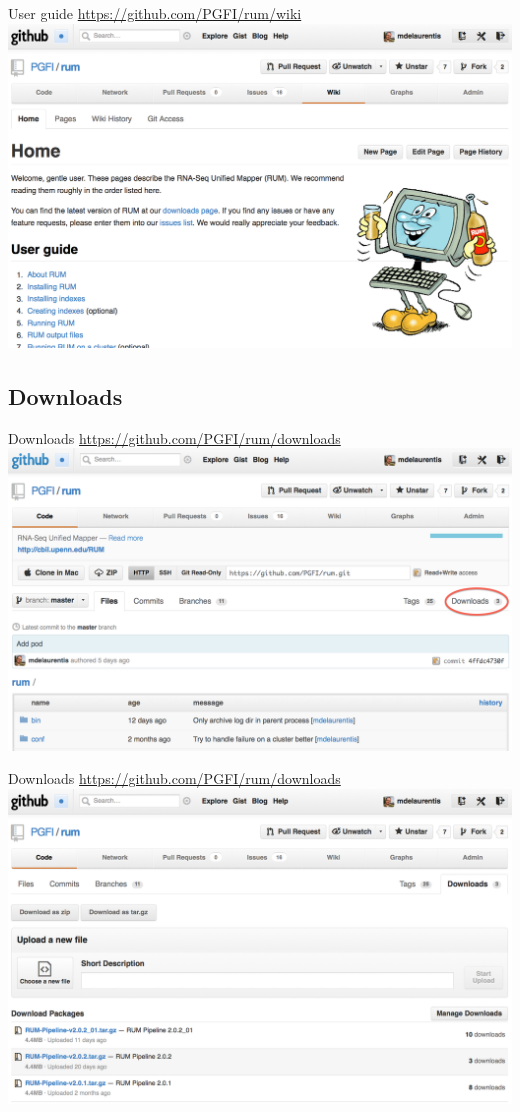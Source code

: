\documentclass{beamer}
\begin{document}
\centering
\begin{frame}{User guide}
  \url{https://github.com/PGFI/rum/wiki}
  \includegraphics[scale=0.2]{github-wiki.png}
\end{frame}

\subsection{Downloads}

\centering
\begin{frame}{Downloads}
  \url{https://github.com/PGFI/rum/downloads}
  \includegraphics[scale=0.2]{github-main-downloads.png}
\end{frame}

\centering
\begin{frame}{Downloads}
  \url{https://github.com/PGFI/rum/downloads}
  \includegraphics[scale=0.2]{github-downloads.png}
\end{frame}
\end{document}
